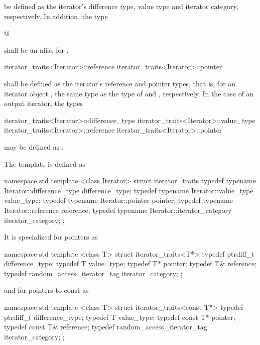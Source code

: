 be defined as the iterator's difference type, value type and iterator category, respectively.
In addition, the type

\begin{addedblock}
\begin{codeblock}
@
\end{codeblock}

shall be an alias for .
\end{addedblock}

\begin{removedblock}
\begin{codeblock}
iterator_traits<Iterator>::reference
iterator_traits<Iterator>::pointer
\end{codeblock}

shall be defined as the iterator's reference and pointer types, that is, for an
iterator object , the same type as the type of  and ,
respectively. In the case of an output iterator, the types

\begin{codeblock}
iterator_traits<Iterator>::difference_type
iterator_traits<Iterator>::value_type
iterator_traits<Iterator>::reference
iterator_traits<Iterator>::pointer
\end{codeblock}

may be defined as .

\pnum
The template
is defined as

\begin{codeblock}
namespace std {
  template <class Iterator> struct iterator_traits {
    typedef typename Iterator::difference_type difference_type;
    typedef typename Iterator::value_type value_type;
    typedef typename Iterator::pointer pointer;
    typedef typename Iterator::reference reference;
    typedef typename Iterator::iterator_category iterator_category;
  };
}
\end{codeblock}

\pnum
It is specialized for pointers as

\begin{codeblock}
namespace std {
  template <class T> struct iterator_traits<T*> {
    typedef ptrdiff_t difference_type;
    typedef T value_type;
    typedef T* pointer;
    typedef T& reference;
    typedef random_access_iterator_tag iterator_category;
  };
}
\end{codeblock}

and for pointers to const as

\begin{codeblock}
namespace std {
  template <class T> struct iterator_traits<const T*> {
    typedef ptrdiff_t difference_type;
    typedef T value_type;
    typedef const T* pointer;
    typedef const T& reference;
    typedef random_access_iterator_tag iterator_category;
  };
}
\end{codeblock}
\end{removedblock}

